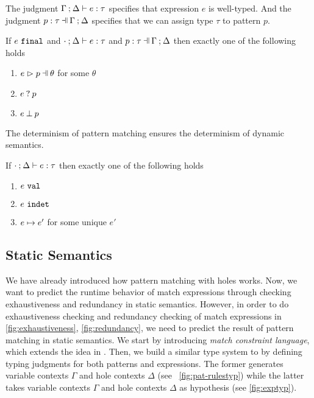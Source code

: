 The judgment $\Gamma \mathbin{;} \Delta \vdash e : \tau$ specifies that expression $e$ is well-typed. And the judgment $\hpattyp{p}{\tau}{\Gamma}{\Delta}$ specifies that we can assign type $\tau$ to pattern $p$.
\begin{lemma}
  \label{lemma:match-determinism}
  If $e ~\mathtt{final}$ and $\cdot \mathbin{;} \Delta \vdash e : \tau$ and $\hpattyp{p}{\tau}{\Gamma}{\Delta}$ then exactly one of the following holds
  \begin{enumerate}
    \item $\hpatmatch{e}{p}{\theta}$ for some $\theta$
    \item $e \mathbin{?} p$
    \item $e \mathbin{\bot} p$
  \end{enumerate}
\end{lemma}

The determinism of pattern matching ensures the determinism of dynamic semantics.

\begin{theorem}[Determinism]
  \label{theorem:determinism}
  If $\cdot \mathbin{;} \Delta \vdash e : \tau$ then exactly one of the following holds
  \begin{enumerate}
    \item $e ~\mathtt{val}$
    \item $e ~\mathtt{indet}$
    \item $e \mapsto e'$ for some unique $e'$
  \end{enumerate}
\end{theorem}

\subsection{Static Semantics}\label{sec:statics}



We have already introduced how pattern matching with holes works. Now, we want
to predict the runtime behavior of match expressions through checking
exhaustiveness and redundancy in static semantics. However, in order to do exhaustiveness checking and redundancy
checking of match expressions in \autoref{fig:exhaustiveness},
\ref{fig:redundancy}, we need to predict the result of pattern matching in static
semantics. We start by introducing \textit{match constraint language}, which
extends the idea in \cite{Harper2012}. Then, we build a similar type system to
\cite{DBLP:journals/pacmpl/OmarVCH19} by defining typing judgments for both
patterns and expressions. The former generates variable contexts $\Gamma$ and
hole contexts $\Delta$ (see \figurename~\ref{fig:pat-rulestyp}) while the latter 
takes variable contexts $\Gamma$ and hole contexts $\Delta$ as hypothesis (see
\autoref{fig:exptyp}).

